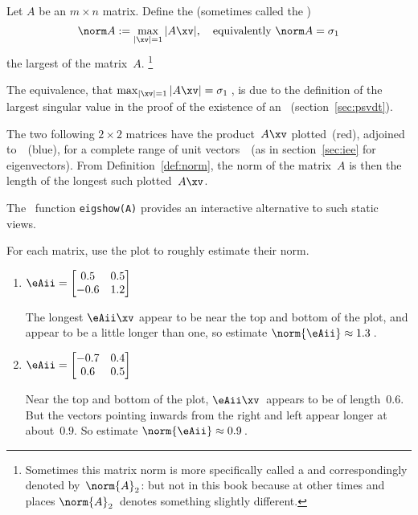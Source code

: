 \begin{definition} \label{def:norm} 
Let \(A\) be an \(m\times n\) matrix.  
Define the  (sometimes called the )
\begin{equation}
\norm A:=\max_{|\xv|=1}|A\xv|, 
\quad\text{equivalently }\norm A=\sigma_1
\label{eq:}
\end{equation}
the largest  of the matrix~\(A\).
\footnote{Sometimes this matrix norm is more specifically called a  and correspondingly denoted by~\(\norm{A}_2\): but not in this book because at other times and places \(\norm{A}_2\)~denotes something slightly different.}
\end{definition}
The equivalence, that \(\max_{|\xv|=1}|A\xv|=\sigma_1\)\,, is due to the definition of the largest singular value in the proof of the existence of an \svd\ (section~\ref{sec:psvdt}).



\begin{example} \label{eg:}
The two following \(2\times2\) matrices have the product~\(A\xv\) plotted~(red), adjoined to~\xv~(blue), for a complete range of unit vectors~\xv\ (as in section~\ref{sec:iee} for eigenvectors).
From Definition~\ref{def:norm}, the norm of the matrix~\(A\) is then the length of the longest such plotted~\(A\xv\).
\begin{aside}
The \script[1]\ function \texttt{eigshow(A)} provides an interactive alternative to such static views.
\end{aside}%
For each matrix, use the plot to roughly estimate their norm.
\begin{enumerate}
\item\label{eg:g2x2norm:a} \(\eAii=\begin{bmatrix} 0.5&0.5\\-0.6&1.2 \end{bmatrix}\)\\
\begin{solution} 
The longest \(\eAii\xv\) appear to be near the top and bottom of the plot, and appear to be a little longer than one, so estimate \(\norm{\eAii}\approx 1.3\)\,.
\end{solution}

\item \(\eAii=\begin{bmatrix} {-0.7}&{0.4}\\{0.6}&{0.5} \end{bmatrix}\)\\
\begin{solution} 
Near the top and bottom of the plot, \(\eAii\xv\)~appears to be of length~\(0.6\).   
But the vectors pointing inwards from the right and left appear  longer at about~\(0.9\). 
So estimate \(\norm{\eAii}\approx 0.9\)\,.
\end{solution}

\end{enumerate}
\end{example}




